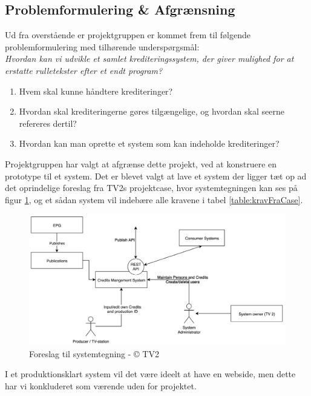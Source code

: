 \subsection{Problemformulering \& Afgrænsning}
Ud fra overstående er projektgruppen er kommet frem til følgende problemformulering med tilhørende underspørgsmål:\\

\noindent
\textit{Hvordan kan vi udvikle et samlet krediteringssystem, der giver mulighed for at erstatte rulletekster efter et endt program?}

\begin{enumerate}
    \item Hvem skal kunne håndtere krediteringer?
    \item Hvordan skal krediteringerne gøres tilgængelige, og hvordan skal seerne refereres dertil?
    \item Hvordan kan man oprette et system som kan indeholde krediteringer?\\ %
\end{enumerate}


\noindent 
Projektgruppen har valgt at afgrænse dette projekt, ved at konstruere en prototype til et system. Det er blevet valgt at lave et system der ligger tæt op ad det oprindelige foreslag fra TV2s projektcase, hvor systemtegningen kan ses på figur \ref{fig:tv2_system}, og et sådan system vil indebære alle kravene i tabel \ref{table:kravFraCase}.
\begin{figure}[H]
    \centering
    \includegraphics[scale=0.4]{figures/tv2_system.png}
    \caption{Foreslag til systemtegning - © TV2}
    \label{fig:tv2_system}
\end{figure}

\noindent %
I et produktionsklart system vil det være ideelt at have en webside, men dette har vi konkluderet som værende uden for projektet.